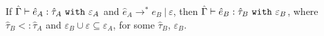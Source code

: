 \begin{theorem}
If $\hat \Gamma \vdash \hat e_A: \hat \tau_A~\mathtt{with}~ \varepsilon_A$ and $\hat e_A \longrightarrow^{*} e_B~|~\varepsilon$, then $\hat \Gamma \vdash \hat e_B: \hat \tau_B~\mathtt{with}~ \varepsilon_B$, where $\hat \tau_B <: \hat \tau_A$ and $\varepsilon_B \cup \varepsilon \subseteq \varepsilon_A$, for some $\hat \tau_B$, $\varepsilon_B$.
\end{theorem}






